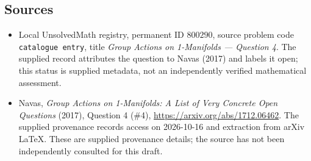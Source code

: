 \documentclass[11pt]{article}
\begin{document}
\subsection{Sources}
\begin{itemize}
\item Local UnsolvedMath registry, permanent ID \(800290\), source problem code \texttt{catalogue entry}, title \emph{Group Actions on 1-Manifolds --- Question 4}. The supplied record attributes the question to Navas (2017) and labels it open; this status is supplied metadata, not an independently verified mathematical assessment.
\item Navas, \emph{Group Actions on 1-Manifolds: A List of Very Concrete Open Questions} (2017), Question 4 (\#4), \url{https://arxiv.org/abs/1712.06462}. The supplied provenance records access on 2026-10-16 and extraction from arXiv LaTeX. These are supplied provenance details; the source has not been independently consulted for this draft.
\end{itemize}
\end{document}
